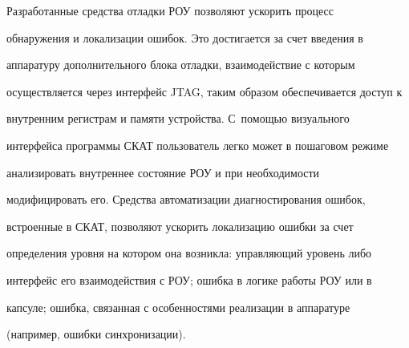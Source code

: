       Разработанные средства отладки РОУ позволяют ускорить процесс 


обнаружения и локализации ошибок. Это достигается за счет введения в 


аппаратуру дополнительного блока отладки, взаимодействие с которым 


осуществляется через интерфейс JTAG, таким образом обеспечивается доступ к 


внутренним регистрам и памяти устройства. С~помощью визуального 


интерфейса программы СКАТ пользователь легко может в пошаговом режиме 


анализировать внутреннее состояние РОУ и при необходимости 


модифицировать его. Средства автоматизации диагностирования ошибок, 


встроенные в СКАТ, позволяют ускорить локализацию ошибки за счет 


определения уровня на котором она возникла: управляющий уровень либо 


интерфейс его взаимодействия с РОУ; ошибка в логике работы РОУ или в 


капсуле; ошибка, связанная с особенностями реализации в аппаратуре 


(например, ошибки синхронизации).





